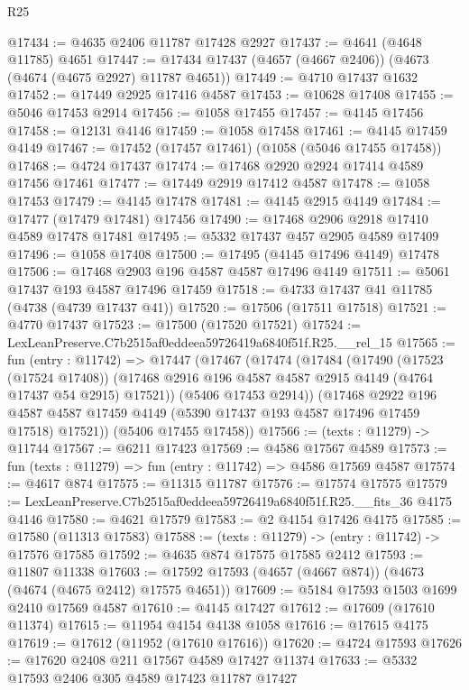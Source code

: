\begin{lexlean}{R25}
\begin{coremodule}
@17434 := @4635 @2406 @11787 @17428 @2927
@17437 := @4641 (@4648 @11785) @4651
@17447 := @17434 @17437 (@4657 (@4667 @2406)) (@4673 (@4674 (@4675 @2927) @11787 @4651))
@17449 := @4710 @17437 @1632
@17452 := @17449 @2925 @17416 @4587
@17453 := @10628 @17408
@17455 := @5046 @17453 @2914
@17456 := @1058 @17455
@17457 := @4145 @17456
@17458 := @12131 @4146
@17459 := @1058 @17458
@17461 := @4145 @17459 @4149
@17467 := @17452 (@17457 @17461) (@1058 (@5046 @17455 @17458))
@17468 := @4724 @17437
@17474 := @17468 @2920 @2924 @17414 @4589 @17456 @17461
@17477 := @17449 @2919 @17412 @4587
@17478 := @1058 @17453
@17479 := @4145 @17478
@17481 := @4145 @2915 @4149
@17484 := @17477 (@17479 @17481) @17456
@17490 := @17468 @2906 @2918 @17410 @4589 @17478 @17481
@17495 := @5332 @17437 @457 @2905 @4589 @17409
@17496 := @1058 @17408
@17500 := @17495 (@4145 @17496 @4149) @17478
@17506 := @17468 @2903 @196 @4587 @4587 @17496 @4149
@17511 := @5061 @17437 @193 @4587 @17496 @17459
@17518 := @4733 @17437 @41 @11785 (@4738 (@4739 @17437 @41))
@17520 := @17506 (@17511 @17518)
@17521 := @4770 @17437
@17523 := @17500 (@17520 @17521)
@17524 := LexLeanPreserve.C7b2515af0eddeea59726419a6840f51f.R25.__rel_15
@17565 := fun (entry : @11742) =>
  @17447
    (@17467
      (@17474
        (@17484
          (@17490
            (@17523 (@17524 @17408))
            (@17468 @2916 @196 @4587 @4587 @2915 @4149 (@4764 @17437 @54 @2915) @17521))
          (@5406 @17453 @2914))
        (@17468
          @2922
          @196
          @4587
          @4587
          @17459
          @4149
          (@5390 @17437 @193 @4587 @17496 @17459 @17518)
          @17521))
      (@5406 @17455 @17458))
@17566 := (texts : @11279) -> @11744
@17567 := @6211 @17423
@17569 := @4586 @17567 @4589
@17573 := fun (texts : @11279) => fun (entry : @11742) => @4586 @17569 @4587
@17574 := @4617 @874
@17575 := @11315 @11787
@17576 := @17574 @17575
@17579 := LexLeanPreserve.C7b2515af0eddeea59726419a6840f51f.R25.__fits_36 @4175 @4146
@17580 := @4621 @17579
@17583 := @2 @4154 @17426 @4175
@17585 := @17580 (@11313 @17583)
@17588 := (texts : @11279) -> (entry : @11742) -> @17576 @17585
@17592 := @4635 @874 @17575 @17585 @2412
@17593 := @11807 @11338
@17603 := @17592 @17593 (@4657 (@4667 @874)) (@4673 (@4674 (@4675 @2412) @17575 @4651))
@17609 := @5184 @17593 @1503 @1699 @2410 @17569 @4587
@17610 := @4145 @17427
@17612 := @17609 (@17610 @11374)
@17615 := @11954 @4154 @4138 @1058
@17616 := @17615 @4175
@17619 := @17612 (@11952 (@17610 @17616))
@17620 := @4724 @17593
@17626 := @17620 @2408 @211 @17567 @4589 @17427 @11374
@17633 := @5332 @17593 @2406 @305 @4589 @17423 @11787 @17427

\end{coremodule}
\end{lexlean}
